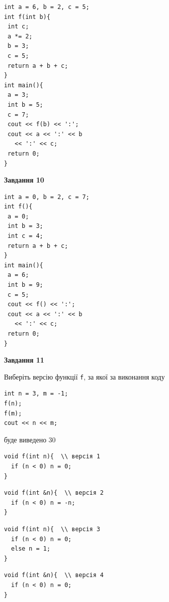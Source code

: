 \documentclass[12pt, ukrainian]{article}
\def\code#1{\Verb!#1!}
\begin{document}
{\begin {large}
\begin{minipage}[t]{7.0cm}
\begin{verbatim}
int a = 6, b = 2, c = 5;
int f(int b){
 int c;
 a *= 2;
 b = 3;
 c = 5;
 return a + b + c;
}
int main(){
 a = 3;
 int b = 5;
 c = 7;
 cout << f(b) << ':';
 cout << a << ':' << b 
   << ':' << c;
 return 0;
}
\end{verbatim}



\begin{center}
\textbf{Завдання 10}
\end{center}
\vspace{-8mm}

\begin{verbatim}
int a = 0, b = 2, c = 7;
int f(){
 a = 0;
 int b = 3;
 int c = 4;
 return a + b + c;
}
int main(){
 a = 6;
 int b = 9;
 c = 5;
 cout << f() << ':';
 cout << a << ':' << b 
   << ':' << c;
 return 0;
}
\end{verbatim}

\end{minipage}
\vline \hspace{1mm}
\begin{minipage}[t]{11.0cm}

\begin{center}
\textbf{Завдання 11}
\end{center}
Виберіть версію функції \code{f}, за якої за виконання коду
\begin{verbatim}
int n = 3, m = -1;
f(n);
f(m);
cout << n << m;
\end{verbatim}

буде виведено 30

\begin{verbatim}
void f(int n){  \\ версія 1
  if (n < 0) n = 0;
}
\end{verbatim}

\vspace{-8mm}\begin{verbatim}
void f(int &n){  \\ версія 2
  if (n < 0) n = -n;
}
\end{verbatim}

\vspace{-8mm}\begin{verbatim}
void f(int n){  \\ версія 3
  if (n < 0) n = 0;
  else n = 1;
}
\end{verbatim}

\vspace{-8mm}\begin{verbatim}
void f(int &n){  \\ версія 4
  if (n < 0) n = 0;
}
\end{verbatim}




\end{minipage}
\end{large}}
\end{document}

